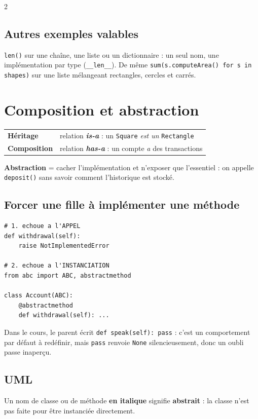 \documentclass[a4paper,10pt]{article}
\newcommand{\co}[1]{\texttt{\textcolor{codefg}{#1}}}
\begin{document}
\begin{multicols}{2}
\subsection{Autres exemples valables}
\co{len()} sur une chaîne, une liste ou un dictionnaire : un seul nom, une
implémentation par type (\co{\_\_len\_\_}). De même
\co{sum(s.computeArea() for s in shapes)} sur une liste mélangeant
rectangles, cercles et carrés.

\section{Composition et abstraction}

\begin{tabularx}{\linewidth}{@{}l>{\raggedright\arraybackslash}X@{}}
\toprule
\textbf{Héritage}    & relation \textbf{\emph{is-a}} : un \co{Square} \emph{est un} \co{Rectangle} \\
\textbf{Composition} & relation \textbf{\emph{has-a}} : un compte \emph{a} des transactions \\
\bottomrule
\end{tabularx}

\vspace{0.4em}
\textbf{Abstraction} = cacher l'implémentation et n'exposer que
l'essentiel : on appelle \co{deposit()} sans savoir comment l'historique est
stocké.

\subsection{Forcer une fille à implémenter une méthode}
\begin{lstlisting}
# 1. echoue a l'APPEL
def withdrawal(self):
    raise NotImplementedError

# 2. echoue a l'INSTANCIATION
from abc import ABC, abstractmethod

class Account(ABC):
    @abstractmethod
    def withdrawal(self): ...
\end{lstlisting}

Dans le cours, le parent écrit \co{def speak(self): pass} : c'est un
comportement par défaut à redéfinir, mais \co{pass} renvoie \co{None}
silencieusement, donc un oubli passe inaperçu.

\subsection{UML}
Un nom de classe ou de méthode \textbf{en italique} signifie
\textbf{abstrait} : la classe n'est pas faite pour être instanciée
directement.


\end{multicols}
\end{document}
